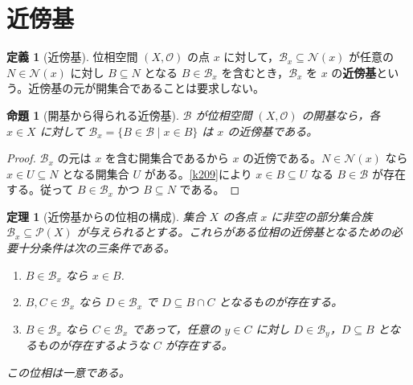 \documentclass[a5paper,10pt,dvipdfmx]{jsarticle}
\theoremstyle{definition}
\newtheorem{defn}[ruledef]{定義}
\theoremstyle{plain}
\newtheorem{prop}[ruledef]{命題}
\newtheorem{thm}[ruledef]{定理}
\newcommand{\Pow}{\mathcal{P}}
\begin{document}
\section{近傍基}
\begin{defn}[近傍基]\label{k214}
位相空間 $(X,\mathcal O)$ の点 $x$ に対して，$\mathcal B_x\subseteq\mathcal N(x)$ が任意の $N\in\mathcal N(x)$ に対し $B\subseteq N$ となる $B\in\mathcal B_x$ を含むとき，$\mathcal B_x$ を $x$ の\textbf{近傍基}という。近傍基の元が開集合であることは要求しない。
\end{defn}
\begin{prop}[開基から得られる近傍基]\label{k215}
$\mathcal B$ が位相空間 $(X,\mathcal O)$ の開基なら，各 $x\in X$ に対して $\mathcal B_x=\{B\in\mathcal B\mid x\in B\}$ は $x$ の近傍基である。
\end{prop}
\begin{proof}
$\mathcal B_x$ の元は $x$ を含む開集合であるから $x$ の近傍である。$N\in\mathcal N(x)$ なら $x\in U\subseteq N$ となる開集合 $U$ がある。\ref{k209}により $x\in B\subseteq U$ なる $B\in\mathcal B$ が存在する。従って $B\in\mathcal B_x$ かつ $B\subseteq N$ である。
\end{proof}
\begin{thm}[近傍基からの位相の構成]\label{k216}
集合 $X$ の各点 $x$ に非空の部分集合族 $\mathcal B_x\subseteq\Pow(X)$ が与えられるとする。これらがある位相の近傍基となるための必要十分条件は次の三条件である。
\begin{enumerate}
\item $B\in\mathcal B_x$ なら $x\in B$.
\item $B,C\in\mathcal B_x$ なら $D\in\mathcal B_x$ で $D\subseteq B\cap C$ となるものが存在する。
\item $B\in\mathcal B_x$ なら $C\in\mathcal B_x$ であって，任意の $y\in C$ に対し $D\in\mathcal B_y$，$D\subseteq B$ となるものが存在するような $C$ が存在する。
\end{enumerate}
この位相は一意である。
\end{thm}
\end{document}
